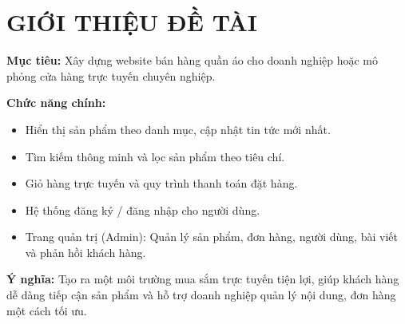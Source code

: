 
\section{GIỚI THIỆU ĐỀ TÀI}
\textbf{Mục tiêu:} Xây dựng website bán hàng quần áo cho doanh nghiệp hoặc mô phỏng cửa hàng trực tuyến chuyên nghiệp.

\textbf{Chức năng chính:}
\begin{itemize}
    \item Hiển thị sản phẩm theo danh mục, cập nhật tin tức mới nhất.
    \item Tìm kiếm thông minh và lọc sản phẩm theo tiêu chí.
    \item Giỏ hàng trực tuyến và quy trình thanh toán đặt hàng.
    \item Hệ thống đăng ký / đăng nhập cho người dùng.
    \item Trang quản trị (Admin): Quản lý sản phẩm, đơn hàng, người dùng, bài viết và phản hồi khách hàng.
\end{itemize}

\textbf{Ý nghĩa:} Tạo ra một môi trường mua sắm trực tuyến tiện lợi, giúp khách hàng dễ dàng tiếp cận sản phẩm và hỗ trợ doanh nghiệp quản lý nội dung, đơn hàng một cách tối ưu.


